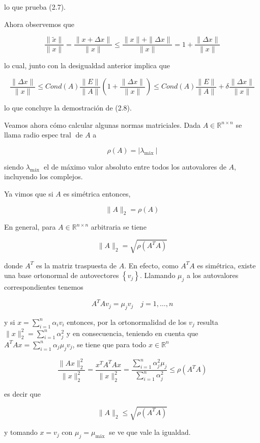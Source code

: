 \documentclass[10pt]{article}
\begin{document}
lo que prueba (2.7).

Ahora observemos que

$$
\frac{\|\tilde{x}\|}{\|x\|}=\frac{\|x+\Delta x\|}{\|x\|} \leq \frac{\|x\|+\|\Delta x\|}{\|x\|}=1+\frac{\|\Delta x\|}{\|x\|}
$$

lo cual, junto con la desigualdad anterior implica que

$$
\frac{\|\Delta x\|}{\|x\|} \leq C o n d(A) \frac{\|E\|}{\|A\|}\left(1+\frac{\|\Delta x\|}{\|x\|}\right) \leq C o n d(A) \frac{\|E\|}{\|A\|}+\delta \frac{\|\Delta x\|}{\|x\|}
$$

lo que concluye la demostración de (2.8).

Veamos ahora cómo calcular algunas normas matriciales. Dada $A \in \mathbb{R}^{n \times n}$ se llama radio espec$\operatorname{tral}$ de $A$ a

$$
\rho(A)=\left|\lambda_{\text {máx }}\right|
$$

siendo $\lambda_{\text {máx }}$ el de máximo valor absoluto entre todos los autovalores de $A$, incluyendo los complejos.

Ya vimos que si $A$ es simétrica entonces,

$$
\|A\|_{2}=\rho(A)
$$

En general, para $A \in \mathbb{R}^{n \times n}$ arbitraria se tiene

$$
\|A\|_{2}=\sqrt{\rho\left(A^{T} A\right)}
$$

donde $A^{T}$ es la matriz traspuesta de $A$. En efecto, como $A^{T} A$ es simétrica, existe una base ortonormal de autovectores $\left\{v_{j}\right\}$. Llamando $\mu_{j}$ a los autovalores correspondientes tenemos

$$
A^{T} A v_{j}=\mu_{j} v_{j} \quad j=1, \ldots, n
$$

y si $x=\sum_{i=1}^{n} \alpha_{i} v_{i}$ entonces, por la ortonormalidad de los $v_{j}$ resulta $\|x\|_{2}^{2}=\sum_{i=1}^{n} \alpha_{j}^{2}$ y en consecuencia, teniendo en cuenta que $A^{T} A x=\sum_{i=1}^{n} \alpha_{j} \mu_{j} v_{j}$, se tiene que para todo $x \in \mathbb{R}^{n}$

$$
\frac{\|A x\|_{2}^{2}}{\|x\|_{2}^{2}}=\frac{x^{T} A^{T} A x}{\|x\|_{2}^{2}}=\frac{\sum_{i=1}^{n} \alpha_{j}^{2} \mu_{j}}{\sum_{i=1}^{n} \alpha_{j}^{2}} \leq \rho\left(A^{T} A\right)
$$

es decir que

$$
\|A\|_{2} \leq \sqrt{\rho\left(A^{T} A\right)}
$$

y tomando $x=v_{j}$ con $\mu_{j}=\mu_{\text {máx }}$ se ve que vale la igualdad.
\end{document}
